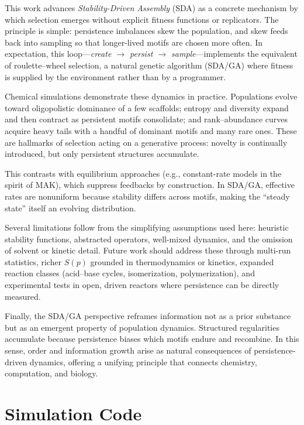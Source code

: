 \documentclass[life,article,submit,pdftex,moreauthors]{Definitions/mdpi}
\begin{document}
This work advances \textit{Stability-Driven Assembly} (SDA) as a concrete mechanism by which selection emerges without explicit fitness functions or replicators. The principle is simple: persistence imbalances skew the population, and skew feeds back into sampling so that longer-lived motifs are chosen more often. In expectation, this loop—\emph{create $\rightarrow$ persist $\rightarrow$ sample}—implements the equivalent of roulette–wheel selection, a natural genetic algorithm (SDA/GA) where fitness is supplied by the environment rather than by a programmer.  

Chemical simulations demonstrate these dynamics in practice. Populations evolve toward oligopolistic dominance of a few scaffolds; entropy and diversity expand and then contract as persistent motifs consolidate; and rank–abundance curves acquire heavy tails with a handful of dominant motifs and many rare ones. These are hallmarks of selection acting on a generative process: novelty is continually introduced, but only persistent structures accumulate.  

This contrasts with equilibrium approaches (e.g., constant-rate models in the spirit of MAK), which suppress feedbacks by construction. In SDA/GA, effective rates are nonuniform because stability differs across motifs, making the “steady state” itself an evolving distribution.  

Several limitations follow from the simplifying assumptions used here: heuristic stability functions, abstracted operators, well-mixed dynamics, and the omission of solvent or kinetic detail. Future work should address these through multi-run statistics, richer $S(p)$ grounded in thermodynamics or kinetics, expanded reaction classes (acid–base cycles, isomerization, polymerization), and experimental tests in open, driven reactors where persistence can be directly measured.  

Finally, the SDA/GA perspective reframes information not as a prior substance but as an emergent property of population dynamics. Structured regularities accumulate because persistence biases which motifs endure and recombine. In this sense, order and information growth arise as natural consequences of persistence-driven dynamics, offering a unifying principle that connects chemistry, computation, and biology.  


\section{Simulation Code}
\end{document}
